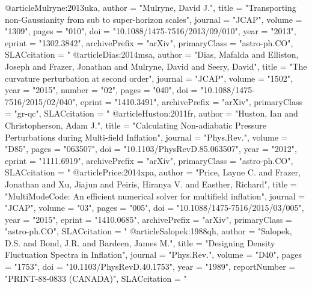 @article{Mulryne:2013uka,
      author         = "Mulryne, David J.",
      title          = "{Transporting non-Gaussianity from sub to super-horizon
                        scales}",
      journal        = "JCAP",
      volume         = "1309",
      pages          = "010",
      doi            = "10.1088/1475-7516/2013/09/010",
      year           = "2013",
      eprint         = "1302.3842",
      archivePrefix  = "arXiv",
      primaryClass   = "astro-ph.CO",
      SLACcitation   = "%
}
@article{Dias:2014msa,
      author         = "Dias, Mafalda and Elliston, Joseph and Frazer, Jonathan
                        and Mulryne, David and Seery, David",
      title          = "{The curvature perturbation at second order}",
      journal        = "JCAP",
      volume         = "1502",
      year           = "2015",
      number         = "02",
      pages          = "040",
      doi            = "10.1088/1475-7516/2015/02/040",
      eprint         = "1410.3491",
      archivePrefix  = "arXiv",
      primaryClass   = "gr-qc",
      SLACcitation   = "%
}
@article{Huston:2011fr,
      author         = "Huston, Ian and Christopherson, Adam J.",
      title          = "{Calculating Non-adiabatic Pressure Perturbations during
                        Multi-field Inflation}",
      journal        = "Phys.Rev.",
      volume         = "D85",
      pages          = "063507",
      doi            = "10.1103/PhysRevD.85.063507",
      year           = "2012",
      eprint         = "1111.6919",
      archivePrefix  = "arXiv",
      primaryClass   = "astro-ph.CO",
      SLACcitation   = "%
}
@article{Price:2014xpa,
      author         = "Price, Layne C. and Frazer, Jonathan and Xu, Jiajun and
                        Peiris, Hiranya V. and Easther, Richard",
      title          = "{MultiModeCode: An efficient numerical solver for
                        multifield inflation}",
      journal        = "JCAP",
      volume         = "03",
      pages          = "005",
      doi            = "10.1088/1475-7516/2015/03/005",
      year           = "2015",
      eprint         = "1410.0685",
      archivePrefix  = "arXiv",
      primaryClass   = "astro-ph.CO",
      SLACcitation   = "%
}
@article{Salopek:1988qh,
      author         = "Salopek, D.S. and Bond, J.R. and Bardeen, James M.",
      title          = "{Designing Density Fluctuation Spectra in Inflation}",
      journal        = "Phys.Rev.",
      volume         = "D40",
      pages          = "1753",
      doi            = "10.1103/PhysRevD.40.1753",
      year           = "1989",
      reportNumber   = "PRINT-88-0833 (CANADA)",
      SLACcitation   = "%
}
